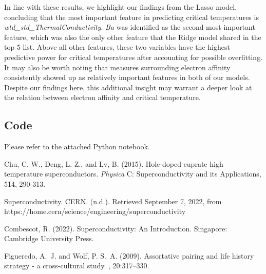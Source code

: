 \documentclass[twoside,twocolumn]{article}
\begin{document}
In line with these results, we highlight our findings from the Lasso model, concluding that the most important feature in predicting critical temperatures is \emph{wtd\_std\_ThermalConductivity}. \emph{Ba} was identified as the second most important feature, which was also the only other feature that the Ridge model shared in the top 5 list. Above all other features, these two variables have the highest predictive power for critical temperatures after accounting for possible overfitting. It may also be worth noting that measures surrounding electron affinity consistently showed up as relatively important features in both of our models. Despite our findings here, this additional insight may warrant a deeper look at the relation between electron affinity and critical temperature.  



\subsection{Code}
Please refer to the attached Python notebook.



\begin{thebibliography}{99} %

Chu, C. W., Deng, L. Z., and Lv, B. (2015). Hole-doped cuprate high temperature superconductors. {\em Physica} C: Superconductivity and its Applications, 514, 290-313.

Superconductivity. CERN. (n.d.). Retrieved September 7, 2022, from https://home.cern/science/engineering/superconductivity 

\bibitem[Combescot, 2022]{}Combescot, R. (2022). Superconductivity: An Introduction. Singapore: Cambridge University Press.

Figueredo, A.~J. and Wolf, P. S.~A. (2009).
\newblock Assortative pairing and life history strategy - a cross-cultural
  study.
, 20:317--330.
 
\end{thebibliography}

\end{document}
